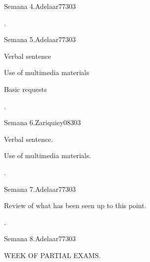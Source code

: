 \begin{syllabus}
\begin{unit}{Semana 4.}{}{Adelaar77}{30}{3}
   \begin{learningoutcomes}
      \item .
   \end{learningoutcomes}
\end{unit}

\begin{unit}{Semana 5.}{}{Adelaar77}{30}{3}
   \begin{topics}
      \item Verbal sentence
      \item Use of multimedia materials
      \item Basic requests
   \end{topics}

   \begin{learningoutcomes}
      \item .
   \end{learningoutcomes}
\end{unit}

\begin{unit}{Semana 6.}{}{Zariquiey08}{30}{3}
   \begin{topics}
      \item Verbal sentence.
      \item Use of multimedia materials.
   \end{topics}

   \begin{learningoutcomes}
      \item .
   \end{learningoutcomes}
\end{unit}

\begin{unit}{Semana 7.}{}{Adelaar77}{30}{3}
   \begin{topics}
      \item Review of what has been seen up to this point.
   \end{topics}

   \begin{learningoutcomes}
      \item .
   \end{learningoutcomes}
\end{unit}

\begin{unit}{Semana 8.}{}{Adelaar77}{30}{3}
   \begin{topics}
      \item WEEK OF PARTIAL EXAMS.
   \end{topics}


\end{unit}
\end{syllabus}
